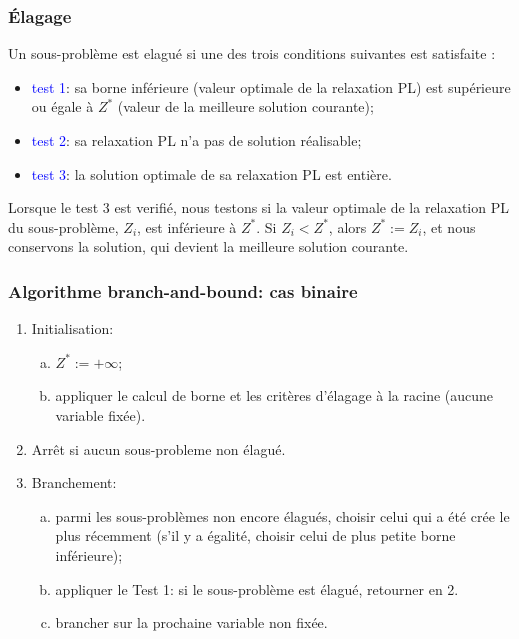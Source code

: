 \documentclass[usepdftitle=false, aspectratio=169]{beamer}
\begin{document}
\begin{frame}
\frametitle{Élagage}

Un sous-problème est elagué si une des trois conditions suivantes est satisfaite :
\begin{itemize}
\item
\textcolor{blue}{test 1}: sa borne inférieure (valeur optimale de la relaxation PL) est supérieure ou égale à $Z^*$ (valeur de la meilleure solution courante);
\item
\textcolor{blue}{test 2}: sa relaxation PL n'a pas de solution réalisable;
\item
\textcolor{blue}{test 3}: la solution optimale de sa relaxation PL est entière.
\end{itemize}
Lorsque le test 3 est verifié, nous testons si la valeur optimale de la relaxation PL du sous-problème, $Z_i$, est inférieure à $Z^*$.
Si $Z_i < Z^*$, alors $Z^* := Z_i$, et nous conservons la solution, qui
devient la meilleure solution courante.

\end{frame}

\begin{frame}
\frametitle{Algorithme branch-and-bound: cas binaire}

\begin{enumerate}
\item
Initialisation:
\begin{enumerate}[(a)]
\item
$Z^* := +\infty$;
\item
appliquer le calcul de borne et les critères d'élagage à la racine (aucune variable fixée).
\end{enumerate}
\item
Arrêt si aucun sous-probleme non élagué.
\item
Branchement:
\begin{enumerate}[(a)]
\item
parmi les sous-problèmes non encore élagués, choisir celui qui a été crée le plus récemment (s'il y a égalité, choisir celui de plus petite borne inférieure);
\item
appliquer le Test 1: si le sous-problème est élagué,
retourner en 2.
\item
brancher sur la prochaine variable non fixée.
\end{enumerate}
\end{enumerate}

\end{frame}
\end{document}
